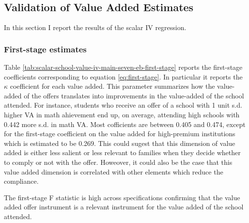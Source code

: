 \documentclass[a4paper, article, english, oneside, unknownkeysallowed, 12pt]{memoir}
\begin{document}
\subsection{Validation of Value Added Estimates}

In this section I report the results of the scalar IV regression. 

\subsubsection{First-stage estimates}

Table \ref{tab:scalar-school-value-iv-main-seven-eb-first-stage} reports the first-stage coefficients corresponding to equation \ref{eq:first-stage}. 
In particular it reports the $\kappa$ coefficient for each value added.
This parameter summarizes how the value-added of the offers translates into improvements in the value-added of the school attended. 
For instance, students who receive an offer of a school with 1 unit s.d. higher VA in math ahievement end up, on average, attending high schools with 0.442 more s.d. in math VA. 
Most cofficients are between 0.405 and 0.474, except for the first-stage coefficient on the value added for high-premium institutions which is estimated to be 0.269. 
This could sugest that this dimension of value added is either less salient or less relevant to families when they decide whether to comply or not with the offer. 
Howeover, it could also be the case that this value added dimension is correlated with other elements which reduce the compliance. 







The first-stage F statistic is high across specifications confirming that the value added offer instrument is a relevant instrument for the value added of the school attended.

\end{document}
